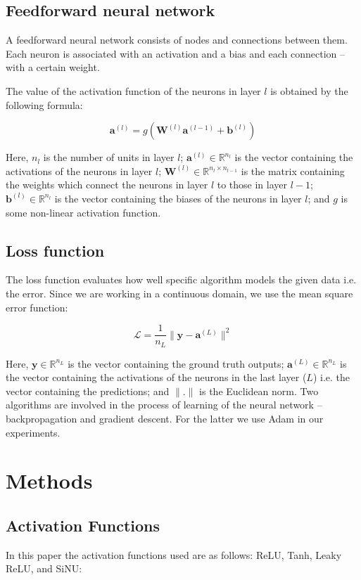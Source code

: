 \documentclass{article}
\begin{document}
    \subsection{Feedforward neural network}
    A feedforward neural network consists of nodes and connections between them. Each neuron is associated with an activation and a bias and each connection -- with a certain weight.
   
    The value of the activation function of the neurons in layer $l$ is obtained by the following formula:
    
     $$\bm a^{(l)} = g(\bm W^{(l)} \bm a^{(l-1)} + \bm b^{(l)})$$
     
    Here, $n_l$ is the number of units in layer $l$; $\bm a^{(l)} \in \mathbb{R}^{n_l}$ is the vector containing the activations of the neurons in layer $l$; $\bm W^{(l)} \in \mathbb{R}^{n_l \times n_{l-1}}$ is the matrix containing the weights which connect the neurons in layer $l$ to those in layer $l-1$; $\bm b^{(l)} \in \mathbb{R}^{n_l}$ is the vector containing the biases of the neurons in layer $l$; and $g$ is some non-linear activation function.
    
   \subsection{Loss function}
    
    The loss function evaluates how well specific algorithm models the given data i.e. the error. Since we are working in a continuous domain, we use the mean square error function:
    
    $$\mathcal{L} = \frac{1}{n_L}\|\bm y - \bm a^{(L)}\|^2$$
    
    Here, $\bm y \in \mathbb{R}^{n_L}$ is the vector containing the ground truth outputs; $\bm a^{(L)} \in \mathbb{R}^{n_L}$ is the vector containing the activations of the neurons in the last layer ($L$) i.e. the vector containing the predictions; and $\|.\|$ is the Euclidean norm.   
    Two algorithms are involved in the process of learning of the neural network -- backpropagation and gradient descent. For the latter we use Adam \cite{adam} in our experiments.
    
\section{Methods}
\label{Methods}

    \subsection{Activation Functions}
    In this paper the activation functions used are as follows:
    ReLU, Tanh, Leaky ReLU, and SiNU:
    
\end{document}
